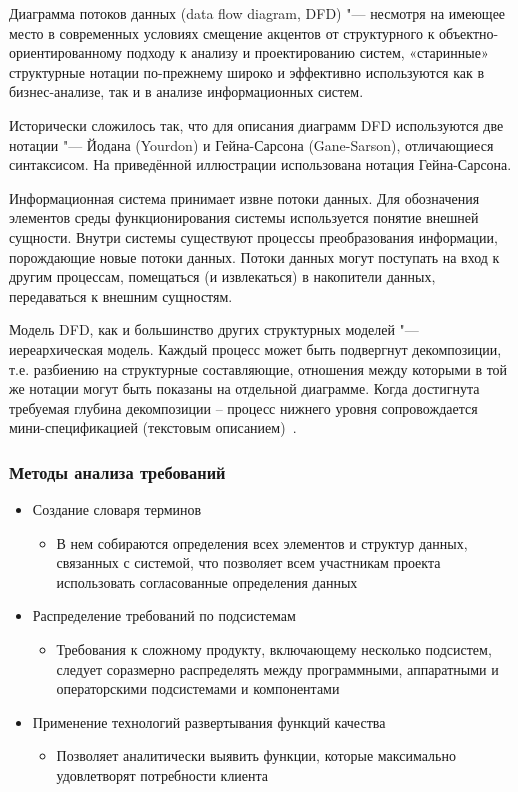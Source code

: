 \documentclass{../industrial-development}
\begin{document}
\lecturenotes

\alert{Диаграмма потоков данных} (data flow diagram, DFD) "--- несмотря на имеющее место в современных условиях смещение акцентов от структурного к объектно-ориентированному подходу к анализу и проектированию систем, «старинные» структурные нотации по-прежнему
широко и эффективно используются как в бизнес-анализе, так и в анализе информационных систем.

Исторически сложилось так, что для описания диаграмм DFD используются две нотации "--- Йодана (Yourdon) и Гейна-Сарсона (Gane-Sarson), отличающиеся синтаксисом. На приведённой иллюстрации использована нотация Гейна-Сарсона.

Информационная система принимает извне потоки данных. Для обозначения элементов среды функционирования системы используется понятие внешней сущности. Внутри системы существуют процессы преобразования информации, порождающие новые потоки данных. Потоки данных могут поступать на вход к другим процессам, помещаться (и извлекаться) в накопители данных, передаваться к внешним сущностям.

Модель DFD, как и большинство других структурных моделей "--- иереархическая модель. Каждый процесс может быть подвергнут декомпозиции, т.е. разбиению на структурные составляющие, отношения между которыми в той же нотации могут быть показаны на отдельной диаграмме. Когда достигнута требуемая глубина декомпозиции – процесс нижнего уровня сопровождается мини-спецификацией (текстовым описанием)~\cite[с.~48--49]{Maglinec}.


\begin{frame} \frametitle{Методы анализа требований}
\begin{itemize}
\item  \alert{Создание словаря терминов}
\begin{itemize}
\item  В нем собираются определения всех элементов и структур данных, связанных с системой, что позволяет всем участникам проекта использовать согласованные определения данных
\end{itemize}
\item \alert{Распределение требований по подсистемам} 
\begin{itemize}
\item Требования к сложному продукту, включающему несколько подсистем, следует соразмерно распределять между программными, аппаратными и операторскими подсистемами и компонентами
\end{itemize}
\item \alert{Применение технологий развертывания функций качества}
\begin{itemize}
\item Позволяет аналитически выявить функции, которые максимально удовлетворят потребности клиента
\end{itemize}
\end{itemize}
\end{frame}
\end{document}
